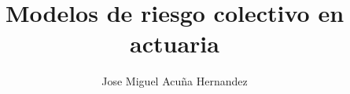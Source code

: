 \documentclass{article}
\author{Jose Miguel Acuña Hernandez}
\title{Modelos de riesgo colectivo en actuaria}
\begin{document}
\thispagestyle{firstpage}
\vspace*{8\baselineskip}
\graphicspath{ {./figures/} }

\renewcommand{\contentsname}{}
\begin{cuadrocontenido}
  \tableofcontents
\end{cuadrocontenido}





\newpage












\end{document}
